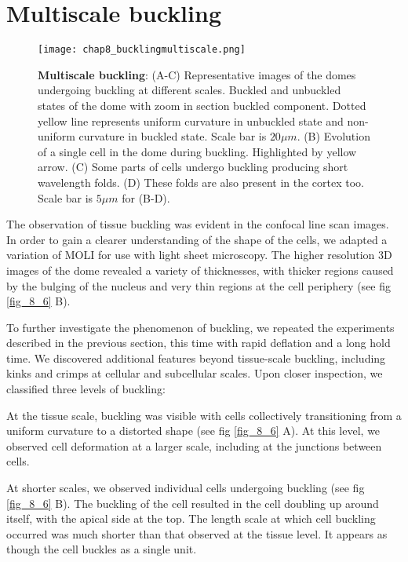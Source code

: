 \hypertarget{multiscale-buckling}{%
	\section{Multiscale buckling}\label{multiscale-buckling}}

\begin{figure}
	\centering
	\texttt{[image: chap8\_bucklingmultiscale.png]}
	\caption{\label{fig_8_4} \textbf{Multiscale buckling}: (A-C) Representative images of the domes undergoing buckling at different scales. Buckled and unbuckled states of the dome with zoom in section buckled component. Dotted yellow line represents uniform curvature in unbuckled state and non-uniform curvature in buckled state. Scale bar is $20 \mu m$. (B) Evolution of a single cell in the dome during buckling. Highlighted by yellow arrow. (C) Some parts of cells undergo buckling producing short wavelength folds. (D) These  folds are also present in the cortex too. Scale bar is $5 \mu m$ for (B-D).
	}
\end{figure}

The observation of tissue buckling was evident in the confocal line scan images. In order to gain a clearer understanding of the shape of the cells, we adapted a variation of MOLI for use with light sheet microscopy. The higher resolution 3D images of the dome revealed a variety of thicknesses, with thicker regions caused by the bulging of the nucleus and very thin regions at the cell periphery (see fig \ref{fig_8_6} B).

To further investigate the phenomenon of buckling, we repeated the experiments described in the previous section, this time with rapid deflation and a long hold time. We discovered additional features beyond tissue-scale buckling, including kinks and crimps at cellular and subcellular scales. Upon closer inspection, we classified three levels of buckling:

At the tissue scale, buckling was visible with cells collectively transitioning from a uniform curvature to a distorted shape (see fig \ref{fig_8_6} A). At this level, we observed cell deformation at a larger scale, including at the junctions between cells.

At shorter scales, we observed individual cells undergoing buckling (see fig \ref{fig_8_6} B). The buckling of the cell resulted in the cell doubling up around itself, with the apical side at the top. The length scale at which cell buckling occurred was much shorter than that observed at the tissue level. It appears as though the cell buckles as a single unit.

